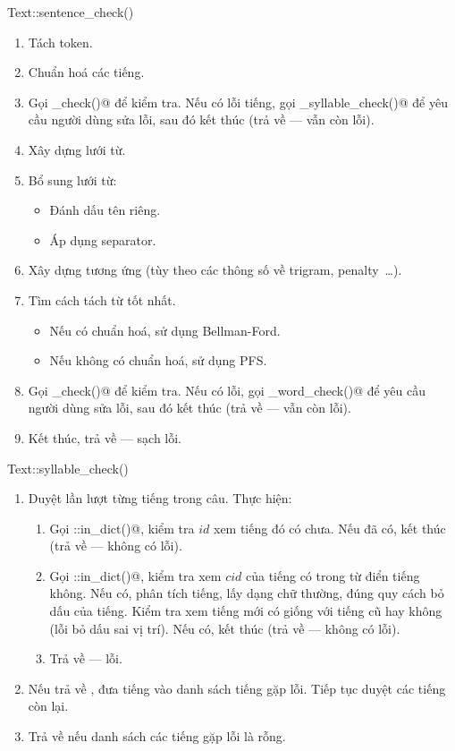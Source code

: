 \documentclass[a4paper,oneside,14pt]{extbook} %
\begin{document}
\begin{algo}
\caption{Text::sentence\_check()}
\label{algo:Text::sentence_check}
  \begin{enumerate}
  \item Tách token.
  \item Chuẩn hoá các tiếng.
  \item Gọi \verb@syllable_check()@ để kiểm tra. Nếu có lỗi tiếng, gọi
    \verb@ui_syllable_check()@ để yêu cầu người dùng sửa lỗi, sau đó
    kết thúc (trả về \verb@false@ --- vẫn còn lỗi).
  \item Xây dựng lưới từ.
  \item Bổ sung lưới từ:
    \begin{itemize}
    \item Đánh dấu tên riêng.
    \item Áp dụng separator.
    \end{itemize}
  \item Xây dựng \verb@DAG@ tương ứng (tùy theo các thông số về
    tri\-gram, penalty~\ldots).
  \item Tìm cách tách từ tốt nhất. 
    \begin{itemize}
    \item Nếu có chuẩn hoá, sử dụng Bellman-Ford.
    \item Nếu không có chuẩn hoá, sử dụng PFS.
    \end{itemize}
  \item Gọi \verb@word_check()@ để kiểm tra. Nếu có lỗi, gọi
    \verb@ui_word_check()@ để yêu cầu người dùng sửa lỗi, sau đó kết
    thúc (trả về \verb@false@ --- vẫn còn lỗi).
  \item Kết thúc, trả về \verb@true@ --- sạch lỗi.
  \end{enumerate}
\end{algo}

\begin{algo}
\caption{Text::syllable\_check()}
\label{algo:Text::syllable_check}
\begin{enumerate}
\item Duyệt lần lượt từng tiếng trong câu. Thực hiện:
  \begin{enumerate}
  \item Gọi \verb@VSpell::in_dict()@, kiểm tra $id$ xem tiếng đó có
    chưa. Nếu đã có, kết thúc (trả về \verb@true@ --- không có lỗi).
  \item Gọi \verb@StringArchive::in_dict()@, kiểm tra xem $cid$ của
    tiếng có trong từ điển tiếng không. Nếu có, phân tích tiếng, lấy
    dạng chữ thường, đúng quy cách bỏ dấu của tiếng. Kiểm tra xem tiếng
    mới có giống với tiếng cũ hay không (lỗi bỏ dấu sai vị trí). Nếu có,
    kết thúc (trả về \verb@true@ --- không có lỗi).
  \item Trả về \verb@false@ --- lỗi.
  \end{enumerate}
\item Nếu trả về \verb@false@, đưa tiếng vào danh sách tiếng gặp
  lỗi. Tiếp tục duyệt các tiếng còn lại.
\item Trả về \verb@true@ nếu danh sách các tiếng gặp lỗi là rỗng.
\end{enumerate}
\end{algo}
\end{document}
